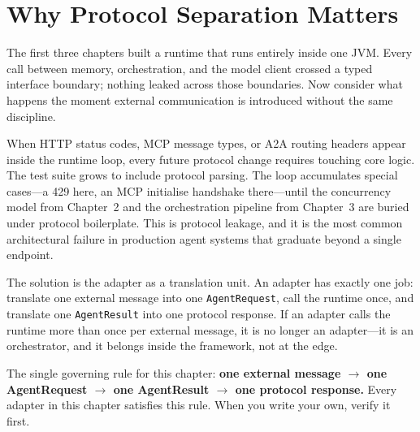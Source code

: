 

\section{Why Protocol Separation Matters}
\label{sec:protocol-separation}

The first three chapters built a runtime that runs entirely inside one
JVM.  Every call between memory, orchestration, and the model client
crossed a typed interface boundary; nothing leaked across those
boundaries.  Now consider what happens the moment external
communication is introduced without the same discipline.

When HTTP status codes, MCP message types, or A2A routing headers
appear inside the runtime loop, every future protocol change requires
touching core logic.  The test suite grows to include protocol
parsing.  The loop accumulates special cases---a 429 here, an MCP
initialise handshake there---until the concurrency model from
Chapter~2 and the orchestration pipeline from Chapter~3 are
buried under protocol boilerplate.  This is protocol leakage, and it
is the most common architectural failure in production agent systems
that graduate beyond a single endpoint.

The solution is the adapter as a translation unit.  An adapter has
exactly one job: translate one external message into one
\lstinline{AgentRequest}, call the runtime once, and translate one
\lstinline{AgentResult} into one protocol response.  If an adapter
calls the runtime more than once per external message, it is no
longer an adapter---it is an orchestrator, and it belongs inside the
framework, not at the edge.

\begin{notebox}
The single governing rule for this chapter: \textbf{one external
message $\rightarrow$ one AgentRequest $\rightarrow$ one AgentResult
$\rightarrow$ one protocol response.}  Every adapter in this chapter
satisfies this rule.  When you write your own, verify it first.
\end{notebox}

